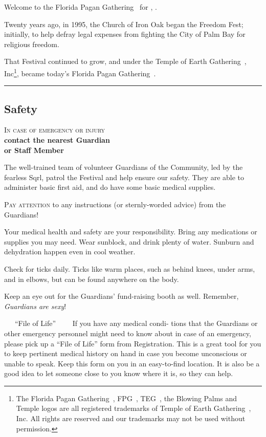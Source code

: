 \documentclass[9pt,twoside,openright,final,article]{memoir}
\def\fpg{{\beltanefamily FPG\ }}
\def\teg{{\hminfamily TEG\ }}
\def\FPG{{\beltanefamily Florida Pagan Gathering\ }}
\def\TEG{{\hminfamily Temple of Earth Gathering\/\ }}
\let\oldsection=\section
\renewcommand{\section}[1]{%
  \vspace{3pt}%
  \needspace{1in}%
  { \hrule } \nopagebreak %
  \begin{center}\oldsection{#1}\end{center}\nopagebreak{}}
\renewcommand{\subsubsection}[1]{%
  \vspace{1pt}\needspace{1.5in}
  {\large ~~~\beltanefamily #1~~~\ }
  \nopagebreak}
\begin{document}
\begin{multicols}{2}


  Welcome to the \FPG\texttrademark{} for \festseason{}, \festyear{}.

  Twenty years  ago, in 1995, the  Church of Iron Oak  began the Freedom
  Fest; initially, to help defray  legal expenses from fighting the City
  of Palm Bay for religious freedom.

  That   Festival    continued   to   grow,   and    under   the   \TEG,
  Inc\texttrademark{}\footnote{The \FPG,  \fpg, \teg, the  Blowing Palms
    and  Temple  logos  are  all registered  trademarks  of  \TEG,  Inc.
    All rights are  reserved and our trademarks may not  be used without
    permission.}, became today's \FPG.


  \section{Safety}


  \begin{center}
    {\large \textsc{In case of emergency or injury} \\
      \textbf{contact the nearest Guardian \\
        or Staff Member}}
  \end{center}


  The well-trained team of volunteer Guardians of the Community, led
  by the fearless Sqrl, patrol the Festival and help ensure our
  safety.  They are able to administer basic first aid, and do have
  some basic medical supplies.

  \textsc{Pay attention} to any instructions (or sternly-worded advice)
  from the Guardians!

  Your medical health and safety are your responsibility.  Bring
  any medications or supplies you may need. Wear sunblock, and drink
  plenty of water.  Sunburn and dehydration happen even in cool
  weather.

  Check for ticks daily. Ticks like warm places, such as behind knees,
  under arms, and in elbows, but can be found anywhere on the body.

  Keep an eye out for the Guardians' fund-raising booth as
  well. Remember, \emph{Guardians are sexy}!

  \subsubsection{``File of Life''} If you have any medical condi-
  tions that the Guardians or other emergency personnel might need to
  know about in case of an emergency, please pick up a ``File of
  Life'' form from Registration. This is a great tool for you to keep
  pertinent medical history on hand in case you become unconscious or
  unable to speak. Keep this form on you in an easy-to-find
  location. It is also be a good idea to let someone close to you know
  where it is, so they can help.


\end{multicols}
\end{document}
